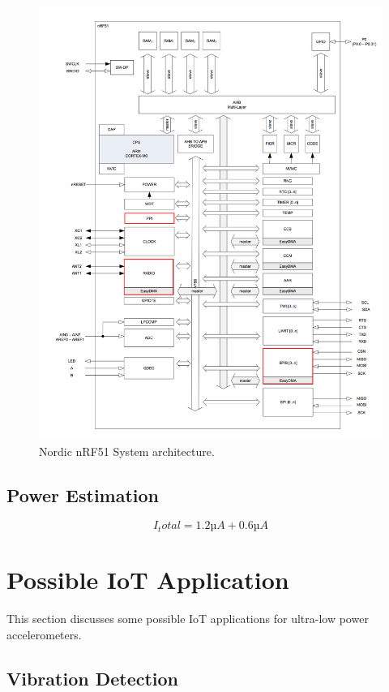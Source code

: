\begin{figure}[h]
\centering
\includegraphics[scale=0.5]{fig/nrf51822_edit.png}
\caption{Nordic nRF51 System architecture. \cite{nRF51}}
\label{fig:accel_working_principle}
\end{figure}

\subsection{Power Estimation}

\begin{equation}
I_total = 1.2µA + 0.6µA
\end{equation}

\section{Possible IoT Application}

This section discusses some possible IoT applications for ultra-low power accelerometers. 

\subsection{Vibration Detection}

